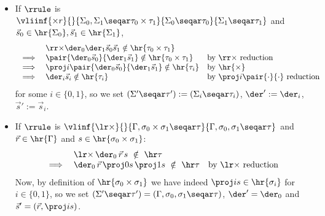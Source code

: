\begin{definition}
\begin{itemize}
Otherwise if $n= n'+1$ then,
\[
\begin{array}{rll}
     & \Ncnd \der_0 \der_1 \vec s s \, \notin \hr \tau \\
     \implies & \Ncnd \der_0  \der_1 \vec s  (\succ \numeral n') \, \notin \hr \tau & \text{by closure under conversion} \\
     \implies & \der_1  \vec s \numeral n' \, \notin \hr \tau & \text{by $\Ncnd$ reduction}
\end{array}
\]
so we set $(\Sigma'\seqar \tau'):= (\Sigma_0, \nat \seqar \tau)$, $\der':= \der_1$, $\vec s' := (\vec s,\numeral n')$.
        \item If $\rrule$ is
        \(
        \vliinf{\times r }{}{\Sigma_0, \Sigma_1 \seqar \tau_0 \times \tau_1}{\Sigma_0 \seqar \tau_0}{\Sigma_1 \seqar \tau_1}
        \)
        and $\vec s_0 \in \hr{\Sigma_0}, \vec s_1 \in \hr{\Sigma_1}$,
        \[
        \begin{array}{rll}
        & {\rr \times} {\der_0}{\der_1}\vec s_0 \vec s_1 \notin \hr{\tau_0\times \tau_1} & 
        \\ 
        \implies & \pair{\der_0\vec s_0}{\der_1\vec s_1} \notin\hr{\tau_0\times \tau_1} & \text{by $\rr\times$ reduction} \\
        \implies & \proj i \pair{\der_0\vec s_0}{\der_1\vec s_1}  \notin \hr{\tau_i} & \text{by $\hr{\times}$} \\
        \implies & {\der_i}\vec s_i \notin \hr{\tau_i} & \text{by {$\proj i \pair{\cdot}{\cdot}$ reduction}}
        \end{array}
        \]
        for some $i\in \{0,1\}$,
        so we set $(\Sigma' \seqar \tau') := (\Sigma_i \seqar \tau_i)$, $\der' := \der_i$, $\vec s' := \vec s_i$.
    \item If $\rrule$ is $\vlinf{  {\lr \times}}{}{\Gamma, \sigma_0 \times \sigma_1 \seqar \tau  }{\Gamma, \sigma_0,\sigma_1 \seqar \tau}$ and $\vec r \in \hr{\Gamma}$ and $s \in \hr{\sigma_0 \times \sigma_1}$:
    \[
    \begin{array}{rll}
        & {\lr\times }\,  {\der_0}\,  \vec r \, s\ \notin\  \hr\tau & 
        \\
        \implies & {\der_0}\, \vec r \, \proj 0 s\, \proj 1 s \ \notin\  \hr\tau & \text{by $\lr \times$ reduction}
    \end{array}
    \]
    Now, by definition of $\hr{\sigma_0 \times \sigma_1}$ we have indeed $\proj i s \in \hr{\sigma_i}$ for $i\in \{0,1\}$,
    so we set $(\Sigma' \seqar \tau') = (\Gamma,\sigma_0,\sigma_1 \seqar \tau)$, $\der' = \der_0$ and $\vec s' = (\vec r, \proj i s)$.

\end{itemize}
\end{definition}
